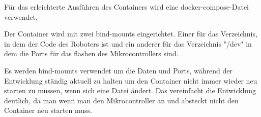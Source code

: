 \begin{flushleft}
    Für das erleichterte Ausführen des Containers wird eine docker-compose-Datei verwendet.

    Der Container wird mit zwei bind-mounts eingerichtet. Einer für das Verzeichnis, 
    in dem der Code des Roboters ist und ein anderer für das Verzeichnis "/dev" in dem die Ports für das flashen des Mikrocontrollers sind.

    Es werden bind-mounts verwendet um die Daten und Ports, während der Entwicklung ständig aktuell zu halten um den Container nicht immer wieder neu starten zu müssen, wenn sich eine Datei ändert.
    Das vereinfacht die Entwicklung deutlich, da man wenn man den Mikrocontroller an und absteckt nicht den Container neu starten muss.
    
\end{flushleft}
